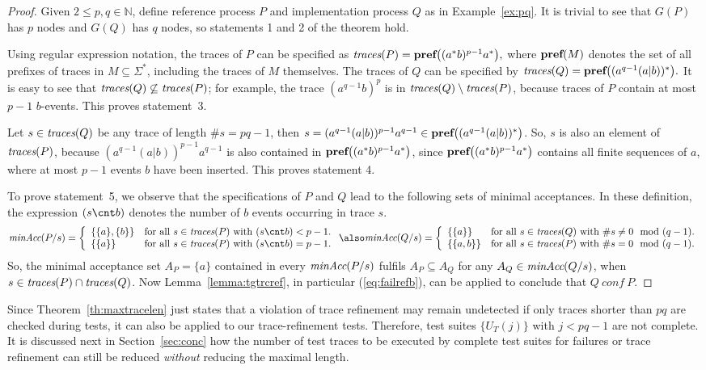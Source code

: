 \begin{proof}
Given $2\le p,q \in\mathbb{N}$, define reference process $P$ and
implementation process $Q$ as in Example~\ref{ex:pq}. It is trivial to see
that $G(P)$ has $p$ nodes and $G(Q)$ has $q$ nodes, so statements 1 and 2 of
the theorem hold.

Using regular expression notation, the traces of $P$ can be specified as
$%
\trc(P) = \prefs\big(  (a^*b)^{p-1}a^* \big),
$ %
where $\text{\bf pref}(M)$ denotes the set of all prefixes of traces in
$M\subseteq\Sigma^*$, including the traces of $M$ themselves. The traces of
$Q$ can be specified by
$%
\trc(Q) = \prefs\big( (a^{q-1}(a|b))^*  \big).
$ %
It is easy to see that $\text{\it traces}(Q)\not\subseteq\text{\it traces}(P)$; for example, the trace
$(a^{q-1}b)^p$ is in $\text{\it traces}(Q)\setminus\text{\it traces}(P)$, because traces of $P$ contain
at most $p-1$ $b$-events. This proves statement~3.

Let $s \in\text{\it traces}(Q)$ be any trace of length $\#s = pq-1$, then $s =
(a^{q-1}(a|b))^{p-1}a^{q-1} \in \text{\bf pref}\big( (a^{q-1}(a|b))^*  \big)$. So, $s$
is also an element of $\text{\it traces}(P)$, because $(a^{q-1}(a|b))^{p-1}a^{q-1}$ is
also contained in $\text{\bf pref}\big( (a^*b)^{p-1}a^* \big)$, since $\text{\bf pref}\big(
(a^*b)^{p-1}a^* \big)$ contains all finite sequences of $a$, where at most
$p-1$ events $b$ have been inserted. This proves statement 4.

To prove statement~5, we observe that the specifications of $P$ and $Q$ lead
to the following sets of minimal acceptances.  In these definition, the
expression $(s\cnt b)$ denotes the number of $b$ events occurring in trace
$s$.
\[
\minaccs(P/s) = \left\{
\begin{array}{ll}
\{ \{a\}, \{b\} \} & \text{for all $s\in\trc(P)$ with $(s\cnt b) <p-1$.}
\\
\{ \{a\} \} & \text{for all $s\in\trc(P)$ with $(s\cnt b) = p-1$.}
\end{array}
\right.
\also
\minaccs(Q/s) = \left\{
\begin{array}{ll}
\{ \{a\}  \} & \text{for all $s\in\trc(Q)$ with $\#s \neq 0\mod(q-1)$.}
\\
\{ \{a,b\} \} & \text{for all $s\in\trc(P)$ with $\#s = 0\mod(q-1)$.}
\end{array}
\right.
\]
So, the minimal acceptance set $A_P = \{a\}$ contained in every
$\text{\it minAcc}(P/s)$ fulfils $A_P \subseteq A_Q$ for any $A_Q\in\text{\it minAcc}(Q/s)$,
when $s\in\text{\it traces}(P)\cap \text{\it traces}(Q)$. Now Lemma~\ref{lemma:tgtrcref}, in particular
(\ref{eq:failrefb}), can be applied to conclude that $Q\ conf\ P$. \xbox
\end{proof}
%
Since Theorem~\ref{th:maxtracelen} just states that a violation of trace
refinement may remain undetected if only traces shorter than $pq$ are checked
during tests, it can also be applied to our trace-refinement tests.
Therefore, test suites $\{ U_T(j) \}$ with $j<pq-1$ are not complete. It is
discussed next in Section~\ref{sec:conc} how the number of test traces to be
executed by complete test suites for failures or trace refinement can still
be reduced {\it without} reducing the maximal length.

